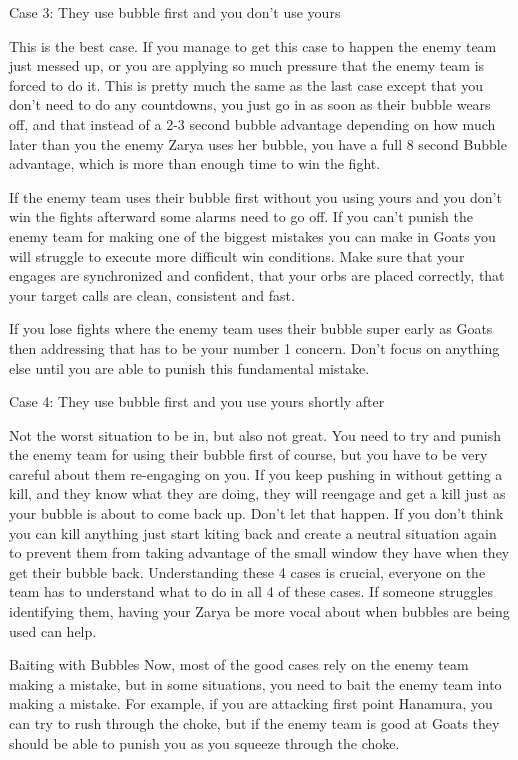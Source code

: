 Case 3: They use bubble first and you don’t use yours

This is the best case. If you manage to get this case to happen the enemy team just messed up, or you are applying so much pressure that the enemy team is forced to do it. This is pretty much the same as the last case except that you don’t need to do any countdowns, you just go in as soon as their bubble wears off, and that instead of a 2-3 second bubble advantage depending on how much later than you the enemy Zarya uses her bubble, you have a full 8 second Bubble advantage, which is more than enough time to win the fight.

If the enemy team uses their bubble first without you using yours and you don’t win the fights afterward some alarms need to go off. If you can’t punish the enemy team for making one of the biggest mistakes you can make in Goats you will struggle to execute more difficult win conditions. Make sure that your engages are synchronized and confident, that your orbs are placed correctly, that your target calls are clean, consistent and fast.

If you lose fights where the enemy team uses their bubble super early as Goats then addressing that has to be your number 1 concern. Don’t focus on anything else until you are able to punish this fundamental mistake.

Case 4: They use bubble first and you use yours shortly after

Not the worst situation to be in, but also not great. You need to try and punish the enemy team for using their bubble first of course, but you have to be very careful about them re-engaging on you. If you keep pushing in without getting a kill, and they know what they are doing, they will reengage and get a kill just as your bubble is about to come back up. Don’t let that happen. If you don’t think you can kill anything just start kiting back and create a neutral situation again to prevent them from taking advantage of the small window they have when they get their bubble back. 
Understanding these 4 cases is crucial, everyone on the team has to understand what to do in all 4 of these cases. If someone struggles identifying them, having your Zarya be more vocal about when bubbles are being used can help. 

Baiting with Bubbles
Now, most of the good cases rely on the enemy team making a mistake, but in some situations, you need to bait the enemy team into making a mistake. For example, if you are attacking first point Hanamura, you can try to rush through the choke, but if the enemy team is good at Goats they should be able to punish you as you squeeze through the choke.

